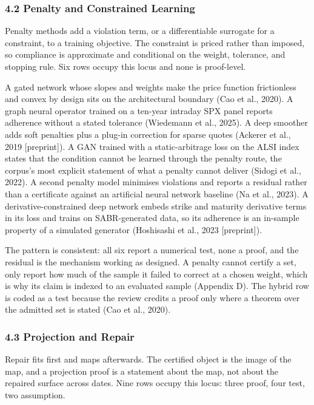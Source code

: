 \documentclass[11pt]{article}
\begin{document}
\subsubsection*{4.2 Penalty and Constrained Learning}
Penalty methods add a violation term, or a differentiable surrogate for a constraint, to a training objective. The constraint is priced rather than imposed, so compliance is approximate and conditional on the weight, tolerance, and stopping rule. Six rows occupy this locus and none is proof-level.

A gated network whose slopes and weights make the price function frictionless and convex by design sits on the architectural boundary (Cao et al., 2020). A graph neural operator trained on a ten-year intraday SPX panel reports adherence without a stated tolerance (Wiedemann et al., 2025). A deep smoother adds soft penalties plus a plug-in correction for sparse quotes (Ackerer et al., 2019 [preprint]). A GAN trained with a static-arbitrage loss on the ALSI index states that the condition cannot be learned through the penalty route, the corpus's most explicit statement of what a penalty cannot deliver (Sidogi et al., 2022). A second penalty model minimises violations and reports a residual rather than a certificate against an artificial neural network baseline (Na et al., 2023). A derivative-constrained deep network embeds strike and maturity derivative terms in its loss and trains on SABR-generated data, so its adherence is an in-sample property of a simulated generator (Hoshisashi et al., 2023 [preprint]).

The pattern is consistent: all six report a numerical test, none a proof, and the residual is the mechanism working as designed. A penalty cannot certify a set, only report how much of the sample it failed to correct at a chosen weight, which is why its claim is indexed to an evaluated sample (Appendix D). The hybrid row is coded as a test because the review credits a proof only where a theorem over the admitted set is stated (Cao et al., 2020).

\subsubsection*{4.3 Projection and Repair}
Repair fits first and maps afterwards. The certified object is the image of the map, and a projection proof is a statement about the map, not about the repaired surface across dates. Nine rows occupy this locus: three proof, four test, two assumption.
\end{document}
